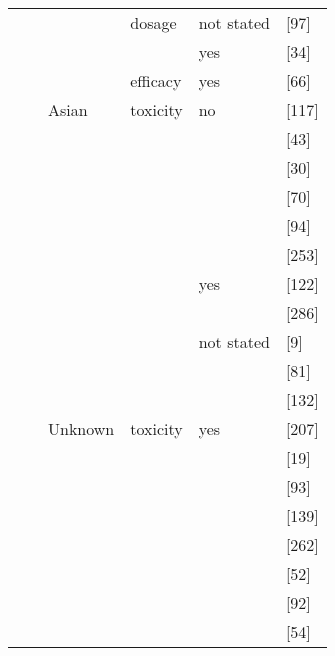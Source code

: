 \begin{center}
\begin{longtable}[H]{|l|l|l|l||l||l|}
\cline{4-6}
& & & dosage & not stated & \citeauthor{Gazouli_2010} \citeyear{Gazouli_2010} [97] \\
\cline{5-6}
& & & & yes & \citeauthor{Stocco_2005} \citeyear{Stocco_2005} [34] \\
\cline{4-6}
& & & efficacy & yes & \citeauthor{pmid9841604} \citeyear{pmid9841604} [66] \\
\cline{3-6}
& & Asian & toxicity & no & \citeauthor{Takatsu_2009} \citeyear{Takatsu_2009} [117] \\
\cline{6-6}
& & & & & \citeauthor{Cao_2009} \citeyear{Cao_2009} [43] \\
\cline{6-6}
& & & & & \citeauthor{Xin_2008} \citeyear{Xin_2008} [30] \\
\cline{6-6}
& & & & & \citeauthor{pmid18827410} \citeyear{pmid18827410} [70] \\
\cline{6-6}
& & & & & \citeauthor{pmid16396707} \citeyear{pmid16396707} [94] \\
\cline{6-6}
& & & & & \citeauthor{Zhu_2016} \citeyear{Zhu_2016} [253] \\
\cline{5-6}
& & & & yes & \citeauthor{Song_2006} \citeyear{Song_2006} [122] \\
\cline{6-6}
& & & & & \citeauthor{Kim_2010} \citeyear{Kim_2010} [286] \\
\cline{5-6}
& & & & not stated & \citeauthor{Tamori_2007} \citeyear{Tamori_2007} [9] \\
\cline{6-6}
& & & & & \citeauthor{Lee_2016} \citeyear{Lee_2016} [81] \\
\cline{6-6}
& & & & & \citeauthor{Fangbin_2016} \citeyear{Fangbin_2016} [132] \\
\cline{3-6}
& & Unknown & toxicity & yes & \citeauthor{ANSARI_2008} \citeyear{ANSARI_2008} [207] \\
\cline{6-6}
& & & & & \citeauthor{Hawwa_2008} \citeyear{Hawwa_2008} [19] \\
\cline{6-6}
& & & & & \citeauthor{Liang_2013} \citeyear{Liang_2013} [93] \\
\cline{6-6}
& & & & & \citeauthor{Vannaprasaht_2009} \citeyear{Vannaprasaht_2009} [139] \\
\cline{6-6}
& & & & & \citeauthor{Zelinkova_2006} \citeyear{Zelinkova_2006} [262] \\
\cline{6-6}
& & & & & \citeauthor{Gardiner_2008} \citeyear{Gardiner_2008} [52] \\
\cline{6-6}
& & & & & \citeauthor{pmid10734022} \citeyear{pmid10734022} [92] \\
\cline{6-6}
& & & & & \citeauthor{Hindorf_2006} \citeyear{Hindorf_2006} [54] \\

\end{longtable}
\end{center}
